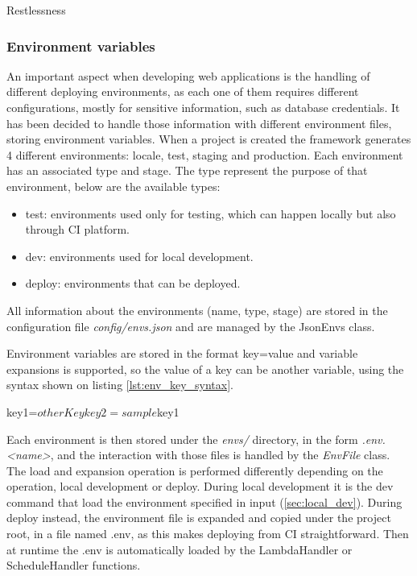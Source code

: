 \begin{chapter}{Restlessness}
    \subsubsection{Environment variables}
    \label{sec:env_vars}
    An important aspect when developing web applications is the handling of different
    deploying environments, as each one of them requires different configurations,
    mostly for sensitive information, such as database credentials.
    It has been decided to handle those information with different environment files,
    storing environment variables.
    When a project is created the framework generates 4 different environments: locale,
    test, staging and production. Each environment has an associated type and stage.
    The type represent the purpose of that environment, below are the available types:
    \begin{itemize}
        \item test: environments used only for testing, which can happen locally
            but also through CI platform.
        \item dev: environments used for local development.
        \item deploy: environments that can be deployed.
    \end{itemize}
    All information about the environments (name, type, stage) are stored in the
    configuration file \textit{config/envs.json} and are managed by the JsonEnvs
    class.

    Environment variables are stored in the format key=value and variable expansions
    is supported, so the value of a key can be another variable, using the syntax
    shown on listing \ref{lst:env_key_syntax}.

    \bigskip
    \begin{code}[caption=Environment variable syntax, label={lst:env_key_syntax}]
key1=${otherKey}
key2=sample ${key1}
    \end{code}

    \noindent
    Each environment is then stored under the \mbox{\textit{envs/}} directory, in
    the form \mbox{\textit{.env.<name>}}, and the interaction with those files is
    handled by the \textit{EnvFile} class. The load and expansion operation is
    performed differently depending on the operation, local development or deploy.
    During local development it is the dev command that load the environment specified
    in input (\ref{sec:local_dev}). During deploy instead, the environment file
    is expanded and copied under the project root, in a file named .env, as this
    makes deploying from CI straightforward. Then at runtime the .env is automatically
    loaded by the LambdaHandler or ScheduleHandler functions.


\end{chapter}
